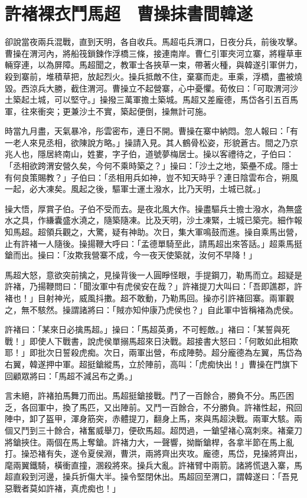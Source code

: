 
\chapter{許褚裸衣鬥馬超　曹操抹書間韓遂}

卻說當夜兩兵混戰，直到天明，各自收兵。馬超屯兵渭口，日夜分兵，前後攻擊。曹操在渭河內，將船筏鎖鍊作浮橋三條，接連南岸。曹仁引軍夾河立寨，將糧草車輛穿連，以為屏障。馬超聞之，教軍士各挾草一束，帶著火種，與韓遂引軍併力，殺到寨前，堆積草把，放起烈火。操兵抵敵不住，棄寨而走。車乘，浮橋，盡被燒毀。西涼兵大勝，截住渭河。曹操立不起營寨，心中憂懼。荀攸曰：「可取渭河沙土築起土城，可以堅守。」操撥三萬軍擔土築城。馬超又差龐德，馬岱各引五百馬軍，往來衝突；更兼沙土不實，築起便倒，操無計可施。

時當九月盡，天氣暴冷，彤雲密布，連日不開。曹操在寨中納悶。忽人報曰：「有一老人來見丞相，欲陳說方略。」操請入見。其人鶴骨松姿，形貌蒼古。間之乃京兆人也，隱居終南山，姓婁，字子伯，道號夢梅居士。操以客禮待之，子伯曰：「丞相欲跨渭安營久矣，今何不乘時築之？」操曰：「沙土之地，築壘不成。隱士有何良策賜教？」子伯曰：「丞相用兵如神，豈不知天時乎？連日陰雲布合，朔風一起，必大凍矣。風起之後，驅軍士運土潑水，比乃天明，土城已就。」

操大悟，厚賞子伯。子伯不受而去。是夜北風大作。操盡驅兵士擔士潑水，為無盛水之具，作縑囊盛水澆之，隨築隨凍。比及天明，沙土凍緊，土城已築完。細作報知馬超。超領兵觀之，大驚，疑有神助。次日，集大軍鳴鼓而進。操自乘馬出營，止有許褚一人隨後。操揚鞭大呼曰：「孟德單騎至此，請馬超出來答話。」超乘馬挺鎗而出。操曰：「汝欺我營寨不成，今一夜天使築就，汝何不早降！」

馬超大怒，意欲突前擒之，見操背後一人圓睜怪眼，手提鋼刀，勒馬而立。超疑是許褚，乃揚鞭問曰：「聞汝軍中有虎侯安在哉？」許褚提刀大叫曰：「吾即譙郡，許褚也！」目射神光，威風抖擻。超不敢動，乃勒馬回。操亦引許褚回寨。兩軍觀之，無不駭然。操謂諸將曰：「賊亦知仲康乃虎侯也？」自此軍中皆稱褚為虎侯。

許褚曰：「某來日必擒馬超。」操曰：「馬超英勇，不可輕敵。」褚曰：「某誓與死戰！」即使人下戰書，說虎侯單搦馬超來日決戰。超接書大怒曰：「何敢如此相欺耶！」即批次日誓殺虎痴。次日，兩軍出營，布成陣勢。超分龐德為左翼，馬岱為右翼，韓遂押中軍。超挺鎗縱馬，立於陣前，高叫：「虎痴快出！」曹操在門旗下回顧眾將曰：「馬超不減呂布之勇。」

言未絕，許褚拍馬舞刀而出。馬超挺鎗接戰。鬥了一百餘合，勝負不分。馬匹困乏，各回軍中，換了馬匹，又出陣前。又鬥一百餘合，不分勝負。許褚性起，飛回陣中，卸了盔甲，渾身筋突，赤體提刀，翻身上馬，來與馬超決戰。兩軍大駭。兩個又鬥到三十餘合，褚奮威舉刀，便砍馬超。超閃過，一鎗望褚心窩刺來。褚棄刀將鎗挾住。兩個在馬上奪鎗。許褚力大，一聲響，拗斷鎗桿，各拿半節在馬上亂打。操恐褚有失，遂令夏侯淵，曹洪，兩將齊出夾攻。龐德，馬岱，見操將齊出，麾兩翼鐵騎，橫衝直撞，溷殺將來。操兵大亂。許褚臂中兩箭。諸將慌退入寨，馬超直殺到河邊，操兵折傷大半。操令堅閉休出。馬超回至渭口，謂韓遂曰：「吾見惡戰者莫如許褚，真虎痴也！」

